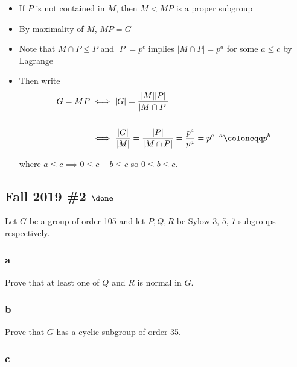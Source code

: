 \begin{solution}
\begin{itemize}
\item
  If \(P\) is not contained in \(M\), then \(M < MP\) is a proper
  subgroup
\item
  By maximality of \(M\), \(MP = G\)
\item
  Note that \(M\cap P \leq P\) and
  \({\left\lvert {P} \right\rvert} = p^c\) implies
  \({\left\lvert {M\cap P} \right\rvert} = p^a\) for some \(a\leq c\) by
  Lagrange
\item
  Then write
  \begin{align*}
  G = MP
  &\iff {\left\lvert {G} \right\rvert} = \frac{{\left\lvert {M} \right\rvert} {\left\lvert {P} \right\rvert}}{{\left\lvert {M\cap P} \right\rvert}} \\ \\
  &\iff { {\left\lvert {G} \right\rvert} \over {\left\lvert {M} \right\rvert}} = {{\left\lvert {P} \right\rvert}  \over {\left\lvert {M\cap P} \right\rvert}} = {p^c \over p^a} = p^{c-a} \coloneqq p^b
  \end{align*}

  where \(a\leq c \implies 0 \leq c-b \leq c\) so \(0\leq b \leq c\).
\end{itemize}

\end{solution}

\hypertarget{fall-2019-2-done}{%
\subsection{\texorpdfstring{Fall 2019 \#2
\(\done\)}{Fall 2019 \#2 \textbackslash done}}\label{fall-2019-2-done}}

Let \(G\) be a group of order 105 and let \(P, Q, R\) be Sylow 3, 5, 7
subgroups respectively.

\hypertarget{a-12}{%
\subsubsection{a}\label{a-12}}

Prove that at least one of \(Q\) and \(R\) is normal in \(G\).

\hypertarget{b-12}{%
\subsubsection{b}\label{b-12}}

Prove that \(G\) has a cyclic subgroup of order 35.

\hypertarget{c-8}{%
\subsubsection{c}\label{c-8}}

